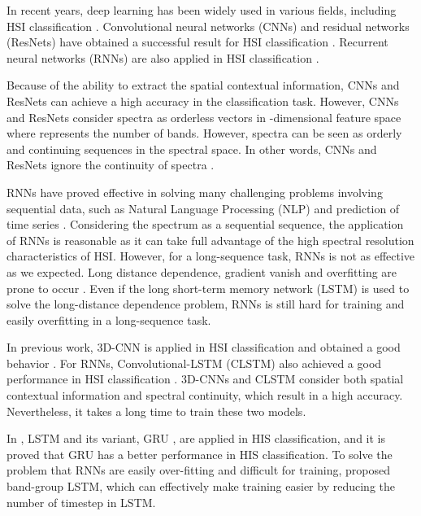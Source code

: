 \documentclass[conference]{IEEEtran}
\begin{document}
In recent years, deep learning has been widely used in various fields, including HSI
classification \cite{zhu2017deep}. Convolutional neural networks (CNNs) and residual
networks (ResNets) have obtained a successful result for HSI classification
\cite{lee2017going, zhong2017deep}. Recurrent neural networks (RNNs) are also applied
in HSI classification \cite{mou2017deep}.

Because of the ability to extract the spatial contextual information, CNNs and ResNets
can achieve a high accuracy in the classification task. However, CNNs and ResNets
consider spectra as orderless vectors in -dimensional feature space where 
represents the number of bands. However, spectra can be seen as orderly and continuing
sequences in the spectral space. In other words, CNNs and ResNets ignore the continuity
of spectra \cite{mou2017deep}.

RNNs have proved effective in solving many challenging problems involving sequential
data, such as Natural Language Processing (NLP) \cite{sundermeyer2015feedforward} and
prediction of time series \cite{gers2002applying}. Considering the spectrum as a
sequential sequence, the application of RNNs is reasonable as it can take full
advantage of the high spectral resolution characteristics of HSI. However, for a
long-sequence task, RNNs is not as effective as we expected. Long distance dependence,
gradient vanish and overfitting are prone to occur \cite{bengio1994learning}. Even if
the long short-term memory network (LSTM) \cite{williams1989learning} is used to solve
the long-distance dependence problem, RNNs is still hard for training and easily
overfitting in a long-sequence task.

In previous work, 3D-CNN is applied in HSI classification and obtained a good behavior
\cite{li2017spectral, zhong2018spectral}. For RNNs, Convolutional-LSTM (CLSTM)
\cite{xingjian2015convolutional} also achieved a good performance in HSI classification
\cite{liu2017bidirectional}. 3D-CNNs and CLSTM consider both spatial contextual
information and spectral continuity, which result in a high accuracy. Nevertheless,
it takes a long time to train these two models.

In \cite{mou2017deep}, LSTM and its variant, GRU \cite{yao2015depth}, are applied in
HIS classification, and it is proved that GRU has a better performance in HIS
classification. To solve the problem that RNNs are easily over-fitting and difficult
for training, \cite{xu2017band} proposed band-group LSTM, which can effectively make
training easier by reducing the number of timestep in LSTM.
\end{document}
